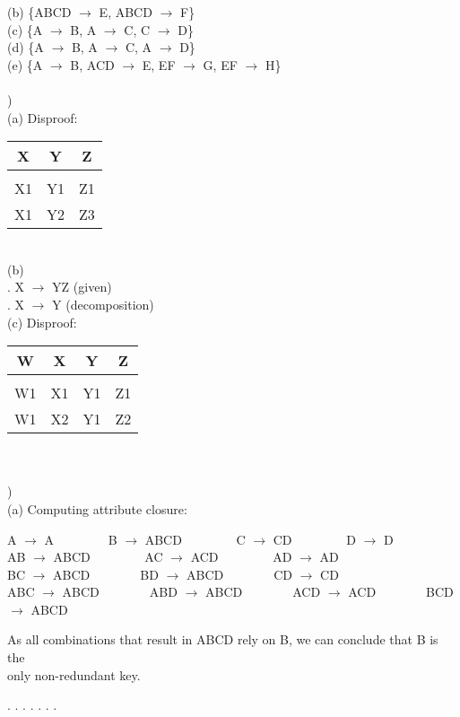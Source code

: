 \documentclass[12pt]{article}
\begin{document}
\indent \indent (b) \{ABCD $\rightarrow$ E, ABCD $\rightarrow$ F\}\\

\indent \indent (c) \{A $\rightarrow$ B, A $\rightarrow$ C, C $\rightarrow$ D\}\\

\indent \indent (d) \{A $\rightarrow$ B, A $\rightarrow$ C, A $\rightarrow$ D\}\\

\indent \indent (e) \{A $\rightarrow$ B, ACD $\rightarrow$ E, EF $\rightarrow$ G, EF $\rightarrow$ H\}\\


\hrulefill\\


) \\
\indent \indent (a) Disproof:
\begin{tabular}{ccc}
 X & Y & Z\\
 \hline &&\\[-1em]
X1 & Y1 & Z1\\
X1 & Y2 & Z3\\
\end{tabular}\\

\indent \indent (b) \\
\indent {}. X $\rightarrow$ YZ (given)\\
\indent {}. X $\rightarrow$ Y (decomposition) \checkmark\\

\indent \indent (c) Disproof:
\begin{tabular}{cccc}
 W & X & Y & Z\\
 \hline &&\\[-1em]
W1 & X1 & Y1 & Z1\\
W1 & X2 & Y1 & Z2\\
\end{tabular}\\


\hrulefill\\


)\\
\indent \indent (a) Computing attribute closure:
\begin{center}
A $\rightarrow$ A \ \ \ \ \ \ \ \ 
B $\rightarrow$ ABCD \ \ \ \ \ \ \ \  
C $\rightarrow$ CD \ \ \ \ \ \ \ \ 
D $\rightarrow$ D\\

AB $\rightarrow$ ABCD \ \ \ \ \ \ \ \ 
AC $\rightarrow$ ACD \ \ \ \ \ \ \ \ 
AD $\rightarrow$ AD \\

BC $\rightarrow$ ABCD\ \ \ \ \ \ \ \ 
BD $\rightarrow$ ABCD\ \ \ \ \ \ \ \ 
CD $\rightarrow$ CD\\

ABC $\rightarrow$ ABCD\ \ \ \ \ \ \ \ 
ABD $\rightarrow$ ABCD\ \ \ \ \ \ \ \ 
ACD $\rightarrow$ ACD\ \ \ \ \ \ \ \ 
BCD $\rightarrow$ ABCD\\
\end{center}

\indent \indent As all combinations that result in ABCD rely on B, we can conclude that B is the\\
\indent \indent only non-redundant key.




\indent \indent 1. 
\indent \indent 2. 
\indent {}. 
\indent {}. 
\indent \indent 5. 
\indent \indent 6. 
\indent {}. 
\end{document}
